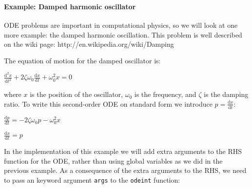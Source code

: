 \documentclass[11pt]{article}
\begin{document}
    \begin{center}
    \end{center}
    { \hspace*{\fill} \\}
    
    \begin{center}
    \end{center}
    { \hspace*{\fill} \\}
    
    \hypertarget{example-damped-harmonic-oscillator}{%
\paragraph{Example: Damped harmonic
oscillator}\label{example-damped-harmonic-oscillator}}

    ODE problems are important in computational physics, so we will look at
one more example: the damped harmonic oscillation. This problem is well
described on the wiki page: http://en.wikipedia.org/wiki/Damping

The equation of motion for the damped oscillator is:

\(\displaystyle \frac{\mathrm{d}^2x}{\mathrm{d}t^2} + 2\zeta\omega_0\frac{\mathrm{d}x}{\mathrm{d}t} + \omega^2_0 x = 0\)

where \(x\) is the position of the oscillator, \(\omega_0\) is the
frequency, and \(\zeta\) is the damping ratio. To write this
second-order ODE on standard form we introduce
\(p = \frac{\mathrm{d}x}{\mathrm{d}t}\):

\(\displaystyle \frac{\mathrm{d}p}{\mathrm{d}t} = - 2\zeta\omega_0 p - \omega^2_0 x\)

\(\displaystyle \frac{\mathrm{d}x}{\mathrm{d}t} = p\)

In the implementation of this example we will add extra arguments to the
RHS function for the ODE, rather than using global variables as we did
in the previous example. As a consequence of the extra arguments to the
RHS, we need to pass an keyword argument \texttt{args} to the
\texttt{odeint} function:
\end{document}
